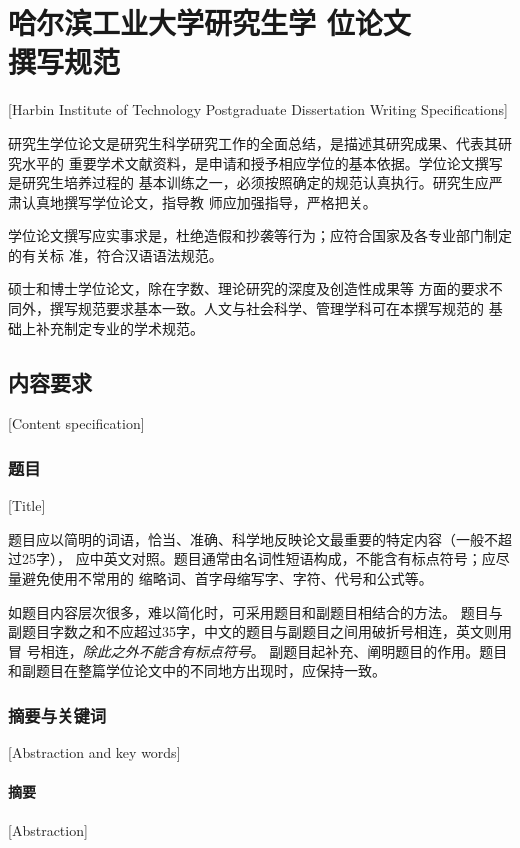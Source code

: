 
\chapter[哈尔滨工业大学研究生学位论文撰写规范]{哈尔滨工业大学研究生学
  位论文\protect\\撰写规范}[Harbin Institute of Technology Postgraduate Dissertation Writing Specifications]

研究生学位论文是研究生科学研究工作的全面总结，是描述其研究成果、代表其研究水平的
重要学术文献资料，是申请和授予相应学位的基本依据。学位论文撰写是研究生培养过程的
基本训练之一，必须按照确定的规范认真执行。研究生应严肃认真地撰写学位论文，指导教
师应加强指导，严格把关。

学位论文撰写应实事求是，杜绝造假和抄袭等行为；应符合国家及各专业部门制定的有关标
准，符合汉语语法规范。

硕士和博士学位论文，除在字数、理论研究的深度及创造性成果等
方面的要求不同外，撰写规范要求基本一致。人文与社会科学、管理学科可在本撰写规范的
基础上补充制定专业的学术规范。

\section{内容要求}[Content specification]

\subsection{题目}[Title]

题目应以简明的词语，恰当、准确、科学地反映论文最重要的特定内容（一般不超过25字），
应中英文对照。题目通常由名词性短语构成，不能含有标点符号；应尽量避免使用不常用的
缩略词、首字母缩写字、字符、代号和公式等。

如题目内容层次很多，难以简化时，可采用题目和副题目相结合的方法。
题目与副题目字数之和不应超过35字，中文的题目与副题目之间用破折号相连，英文则用冒
号相连，\emph{除此之外不能含有标点符号}。
副题目起补充、阐明题目的作用。题目和副题目在整篇学位论文中的不同地方出现时，应保持一致。

\subsection{摘要与关键词}[Abstraction and key words]
\subsubsection{摘要}[Abstraction]

